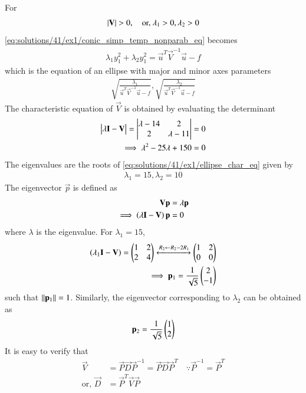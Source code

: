 For 
\begin{align} 
\left\vert\mathbf{V}\right\vert > 0, \quad \text{or, } \lambda_1 > 0, \lambda_2 > 0 
\end{align} 
\eqref{eq:solutions/41/ex1/conic_simp_temp_nonparab_eq} becomes 
\begin{align} \lambda_1y_1^2 +\lambda_2y_1^2 = 
\vec{u}^T\vec{V}^{-1}\vec{u} -f 
\end{align} 
which is the equation of an ellipse with major and minor axes 
parameters
\begin{align} 
\sqrt{\frac{\lambda_1}{\vec{u}^T\vec{V}^{-1}\vec{u} -f}}, 
\sqrt{\frac{\lambda_2}{\vec{u}^T\vec{V}^{-1}\vec{u} -f}} \label{eq:solutions/41/ex1/axes_eq}
\end{align}
The characteristic equation of $\vec{V}$ is obtained by evaluating the determinant
\begin{align}
\begin{vmatrix}\lambda \mathbf{I}-\mathbf{V}\end{vmatrix} = \begin{vmatrix}\lambda -14 & 2 \\ 2 & \lambda -11\end{vmatrix} &= 0
\\
\implies \lambda^2 - 25\lambda + 150 &= 0
\label{eq:solutions/41/ex1/ellipse_char_eq}
\end{align}
The eigenvalues are the roots of \eqref{eq:solutions/41/ex1/ellipse_char_eq} given by
\begin{align}
\lambda_1 = 15, \lambda_2 = 10
\label{eq:solutions/41/ex1/ellipse_eval_eq}
\end{align}
The eigenvector $\vec{p}$ is defined as
\begin{align}
\mathbf{V} \mathbf{p}&= \lambda \mathbf{p}
\\
\implies \left(\lambda\mathbf{I}-\mathbf{V}\right)\mathbf{p} &=0
\end{align}
where $\lambda$ is the eigenvalue.  For $\lambda_1 = 15$,
\begin{align}
\left(\lambda_1\mathbf{I}-\mathbf{V}\right)
= \begin{pmatrix}1 & 2 \\ 2 & 4\end{pmatrix} 
\xleftrightarrow{R_2\leftarrow R_2-2R_1}\begin{pmatrix}1 & 2 \\0 & 0 \end{pmatrix}  
\\
\implies \mathbf{p}_1 = \frac{1}{\sqrt{5}}\begin{pmatrix}2 \\ -1\end{pmatrix}
\end{align}
such that $\left\lVert\mathbf{p}_1\right\rVert = 1$.  Similarly, the eigenvector corresponding to $\lambda_2$ can be obtained as
\begin{align}
 \mathbf{p}_2 = \frac{1}{\sqrt{5}}\begin{pmatrix}1 \\ 2\end{pmatrix}
\end{align}
It is easy to verify that 
\begin{align}
\vec{V} &= \vec{P}\vec{D}\vec{P}^{-1}=\vec{P}\vec{D}\vec{P}^T \quad \because \vec{P}^{-1} = \vec{P}^{T} \label{eq:solutions/41/ex1/ellipse_spectrum_eq}
\\
\text{or, } \vec{D} &= \vec{P}^T\vec{V}\vec{P}
\end{align}
